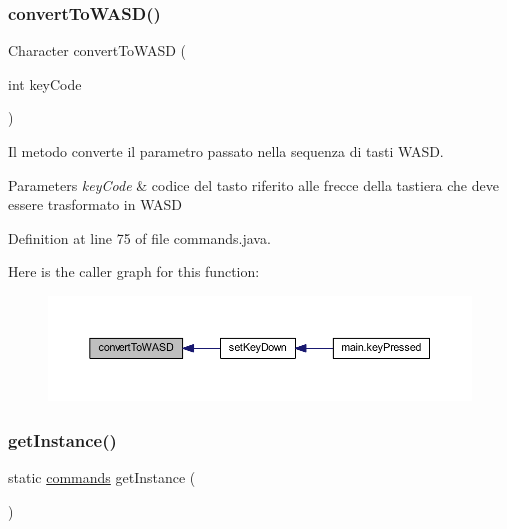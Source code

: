 \subsubsection{\texorpdfstring{convert\+To\+W\+A\+S\+D()}{convertToWASD()}}
{\footnotesize\ttfamily Character convert\+To\+W\+A\+SD (\begin{DoxyParamCaption}\item[{int}]{key\+Code }\end{DoxyParamCaption})\hspace{0.3cm}{\ttfamily [private]}}



Il metodo converte il parametro passato nella sequenza di tasti W\+A\+SD. 


\begin{DoxyParams}{Parameters}
{\em key\+Code} & codice del tasto riferito alle frecce della tastiera che deve essere trasformato in W\+A\+SD \\
\hline
\end{DoxyParams}


Definition at line 75 of file commands.\+java.

Here is the caller graph for this function\+:
\nopagebreak
\begin{figure}[H]
\begin{center}
\leavevmode
\includegraphics[width=350pt]{class_snake_1_1game_1_1utility_1_1commands_a66de6f4fd0fc79b7d17dc3196aa5fe7e_icgraph}
\end{center}
\end{figure}
\mbox{\label{class_snake_1_1game_1_1utility_1_1commands_a388ff71d8b8e9c6f6a68839aa5575acc}} 
\subsubsection{\texorpdfstring{get\+Instance()}{getInstance()}}
{\footnotesize\ttfamily static \mbox{\hyperlink{class_snake_1_1game_1_1utility_1_1commands}{commands}} get\+Instance (\begin{DoxyParamCaption}{ }\end{DoxyParamCaption})\hspace{0.3cm}{\ttfamily [static]}}

